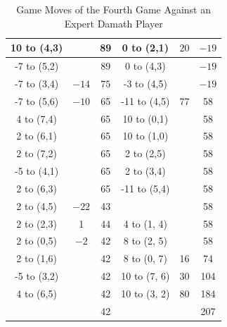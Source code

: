 \begin{appendices}
\begin{table}[H]
\begin{tabular}{cccccc}
          10 to (4,3) &      &  89    &   0 to (2,1)        &  $20$    & $-19$      \\ \hline
          -7 to (5,2) &      &  89    &   0 to (4,3)        &      &  $-19$    \\ \hline
          -7 to (3,4) &  $-14$  & $75$      &   -3 to (4,5)        &     &  $-19$    \\ \hline
          -7 to (5,6) &  $-10$    &  65    &   -11 to (4,5)        &  77    &  58    \\ \hline
          4 to (7,4) &      &  65    &   10 to (0,1)        &      &  58    \\ \hline
          2 to (6,1) &      &  65    &   10 to (1,0)        &      &  58    \\ \hline
          2 to (7,2) &      &  65    &   2 to (2,5)        &      &  58    \\ \hline
          -5 to (4,1) &      &  65    &   2 to (3,4)        &      &  58    \\ \hline
          2 to (6,3) &      &  65    &   -11 to (5,4)        &      &  58    \\ \hline
          2 to (4,5) &  $-22$    &  43    &         &      &  58    \\ \hline
          2 to (2,3) &  1    &  44    &  4 to (1, 4)       &      &  58    \\ \hline
          2 to (0,5) &  $-2$    &  42    &  8 to (2, 5)       &      &  58    \\ \hline
          2 to (1,6) &      &  42    &  8 to (0, 7)       &  16    &  74    \\ \hline
          -5 to (3,2) &      &  42    &  10 to (7, 6)       &  30    &  104    \\ \hline
          4 to (6,5) &      &  42    &  10 to (3, 2)       &  80    &  184    \\ \hline\hline
                     &      &  42    &                     &     &  207    \\ \hline
    \end{tabular}
    \caption{Game Moves of the Fourth Game Against an Expert Damath Player}
    \label{tab:fourth-game}
\end{table}


\end{appendices}
